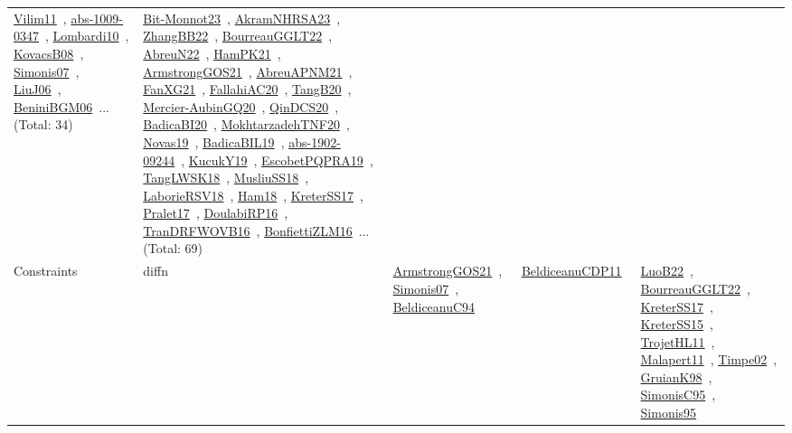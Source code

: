 {\begin{longtable}{lp{3cm}>{\raggedright\arraybackslash}p{6cm}>{\raggedright\arraybackslash}p{6cm}>{\raggedright\arraybackslash}p{8cm}}
\href{works/Vilim11.pdf}{Vilim11}~\cite{Vilim11}, \href{works/abs-1009-0347.pdf}{abs-1009-0347}~\cite{abs-1009-0347}, \href{works/Lombardi10.pdf}{Lombardi10}~\cite{Lombardi10}, \href{works/KovacsB08.pdf}{KovacsB08}~\cite{KovacsB08}, \href{works/Simonis07.pdf}{Simonis07}~\cite{Simonis07}, \href{works/LiuJ06.pdf}{LiuJ06}~\cite{LiuJ06}, \href{works/BeniniBGM06.pdf}{BeniniBGM06}~\cite{BeniniBGM06}... (Total: 34) & \href{works/Bit-Monnot23.pdf}{Bit-Monnot23}~\cite{Bit-Monnot23}, \href{works/AkramNHRSA23.pdf}{AkramNHRSA23}~\cite{AkramNHRSA23}, \href{works/ZhangBB22.pdf}{ZhangBB22}~\cite{ZhangBB22}, \href{works/BourreauGGLT22.pdf}{BourreauGGLT22}~\cite{BourreauGGLT22}, \href{works/AbreuN22.pdf}{AbreuN22}~\cite{AbreuN22}, \href{works/HamPK21.pdf}{HamPK21}~\cite{HamPK21}, \href{works/ArmstrongGOS21.pdf}{ArmstrongGOS21}~\cite{ArmstrongGOS21}, \href{works/AbreuAPNM21.pdf}{AbreuAPNM21}~\cite{AbreuAPNM21}, \href{works/FanXG21.pdf}{FanXG21}~\cite{FanXG21}, \href{works/FallahiAC20.pdf}{FallahiAC20}~\cite{FallahiAC20}, \href{works/TangB20.pdf}{TangB20}~\cite{TangB20}, \href{works/Mercier-AubinGQ20.pdf}{Mercier-AubinGQ20}~\cite{Mercier-AubinGQ20}, \href{works/QinDCS20.pdf}{QinDCS20}~\cite{QinDCS20}, \href{works/BadicaBI20.pdf}{BadicaBI20}~\cite{BadicaBI20}, \href{works/MokhtarzadehTNF20.pdf}{MokhtarzadehTNF20}~\cite{MokhtarzadehTNF20}, \href{works/Novas19.pdf}{Novas19}~\cite{Novas19}, \href{works/BadicaBIL19.pdf}{BadicaBIL19}~\cite{BadicaBIL19}, \href{works/abs-1902-09244.pdf}{abs-1902-09244}~\cite{abs-1902-09244}, \href{works/KucukY19.pdf}{KucukY19}~\cite{KucukY19}, \href{works/EscobetPQPRA19.pdf}{EscobetPQPRA19}~\cite{EscobetPQPRA19}, \href{works/TangLWSK18.pdf}{TangLWSK18}~\cite{TangLWSK18}, \href{works/MusliuSS18.pdf}{MusliuSS18}~\cite{MusliuSS18}, \href{works/LaborieRSV18.pdf}{LaborieRSV18}~\cite{LaborieRSV18}, \href{works/Ham18.pdf}{Ham18}~\cite{Ham18}, \href{works/KreterSS17.pdf}{KreterSS17}~\cite{KreterSS17}, \href{works/Pralet17.pdf}{Pralet17}~\cite{Pralet17}, \href{works/DoulabiRP16.pdf}{DoulabiRP16}~\cite{DoulabiRP16}, \href{works/TranDRFWOVB16.pdf}{TranDRFWOVB16}~\cite{TranDRFWOVB16}, \href{works/BonfiettiZLM16.pdf}{BonfiettiZLM16}~\cite{BonfiettiZLM16}... (Total: 69)\\
Constraints & diffn & \href{works/ArmstrongGOS21.pdf}{ArmstrongGOS21}~\cite{ArmstrongGOS21}, \href{works/Simonis07.pdf}{Simonis07}~\cite{Simonis07}, \href{works/BeldiceanuC94.pdf}{BeldiceanuC94}~\cite{BeldiceanuC94} & \href{works/BeldiceanuCDP11.pdf}{BeldiceanuCDP11}~\cite{BeldiceanuCDP11} & \href{works/LuoB22.pdf}{LuoB22}~\cite{LuoB22}, \href{works/BourreauGGLT22.pdf}{BourreauGGLT22}~\cite{BourreauGGLT22}, \href{works/KreterSS17.pdf}{KreterSS17}~\cite{KreterSS17}, \href{works/KreterSS15.pdf}{KreterSS15}~\cite{KreterSS15}, \href{works/TrojetHL11.pdf}{TrojetHL11}~\cite{TrojetHL11}, \href{works/Malapert11.pdf}{Malapert11}~\cite{Malapert11}, \href{works/Timpe02.pdf}{Timpe02}~\cite{Timpe02}, \href{works/GruianK98.pdf}{GruianK98}~\cite{GruianK98}, \href{works/SimonisC95.pdf}{SimonisC95}~\cite{SimonisC95}, \href{works/Simonis95.pdf}{Simonis95}~\cite{Simonis95}\\

\end{longtable}}
